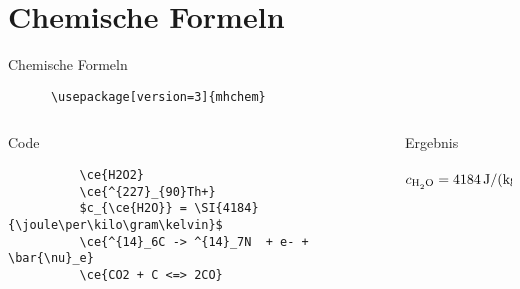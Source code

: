 \section{Chemische Formeln}
\begin{frame}[fragile]{Chemische Formeln}
  \begin{Packages}
    \begin{lstlisting}
      \usepackage[version=3]{mhchem}
    \end{lstlisting}
  \end{Packages}
  \begin{columns}[onlytextwidth, t]
    \begin{column}{0.51\textwidth}
      \begin{tblock}{Code}
        \begin{lstlisting}
          \ce{H2O2}
          \ce{^{227}_{90}Th+}
          $c_{\ce{H2O}} = \SI{4184}{\joule\per\kilo\gram\kelvin}$
          \ce{^{14}_6C -> ^{14}_7N  + e- + \bar{\nu}_e}
          \ce{CO2 + C <=> 2CO}
        \end{lstlisting}
      \end{tblock}
    \end{column}
    \begin{column}{0.45\textwidth}
      \linespread{1.3}
      \begin{tblock}{Ergebnis}
         \\
         \\
        $c_{\ce{H2O}} = \SI{4184}{\joule\per\kilo\gram\per\kelvin}$ \\[0.3\baselineskip]
         \\[0.3\baselineskip]
      \end{tblock}
    \end{column}
  \end{columns}
\end{frame}
